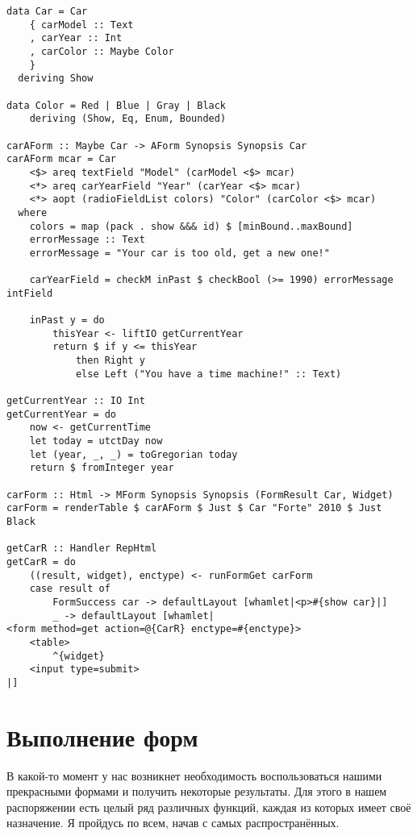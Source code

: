 \begin{lstlisting}[caption={Переключатели},label={lst:radio-buttons}]
data Car = Car
    { carModel :: Text
    , carYear :: Int
    , carColor :: Maybe Color
    }
  deriving Show

data Color = Red | Blue | Gray | Black
    deriving (Show, Eq, Enum, Bounded)

carAForm :: Maybe Car -> AForm Synopsis Synopsis Car
carAForm mcar = Car
    <$> areq textField "Model" (carModel <$> mcar)
    <*> areq carYearField "Year" (carYear <$> mcar)
    <*> aopt (radioFieldList colors) "Color" (carColor <$> mcar)
  where
    colors = map (pack . show &&& id) $ [minBound..maxBound]
    errorMessage :: Text
    errorMessage = "Your car is too old, get a new one!"

    carYearField = checkM inPast $ checkBool (>= 1990) errorMessage intField

    inPast y = do
        thisYear <- liftIO getCurrentYear
        return $ if y <= thisYear
            then Right y
            else Left ("You have a time machine!" :: Text)

getCurrentYear :: IO Int
getCurrentYear = do
    now <- getCurrentTime
    let today = utctDay now
    let (year, _, _) = toGregorian today
    return $ fromInteger year

carForm :: Html -> MForm Synopsis Synopsis (FormResult Car, Widget)
carForm = renderTable $ carAForm $ Just $ Car "Forte" 2010 $ Just Black

getCarR :: Handler RepHtml
getCarR = do
    ((result, widget), enctype) <- runFormGet carForm
    case result of
        FormSuccess car -> defaultLayout [whamlet|<p>#{show car}|]
        _ -> defaultLayout [whamlet|
<form method=get action=@{CarR} enctype=#{enctype}>
    <table>
        ^{widget}
    <input type=submit>
|]
\end{lstlisting}

\section{Выполнение форм}
В какой-то момент у нас возникнет необходимость воспользоваться нашими
прекрасными формами и получить некоторые результаты.  Для этого в нашем
распоряжении есть целый ряд различных функций, каждая из которых имеет своё
назначение. Я пройдусь по всем, начав с самых распространённых.

